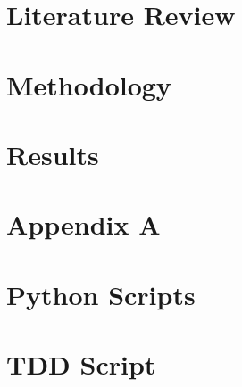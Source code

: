 \documentclass[11pt]{report}
\begin{document}


\newpage
\tableofcontents
\listoffigures
\listoftables
\lstlistoflistings
\newpage

% 
% 

\chapter{Literature Review}



\chapter{Methodology}

\chapter{Results}







\appendix
\chapter{Appendix A}
\FloatBarrier
\chapter{Python Scripts}
\label{appPythonScripts}
\chapter{TDD Script}



\clearpage
{}
\printindex
\end{document}

